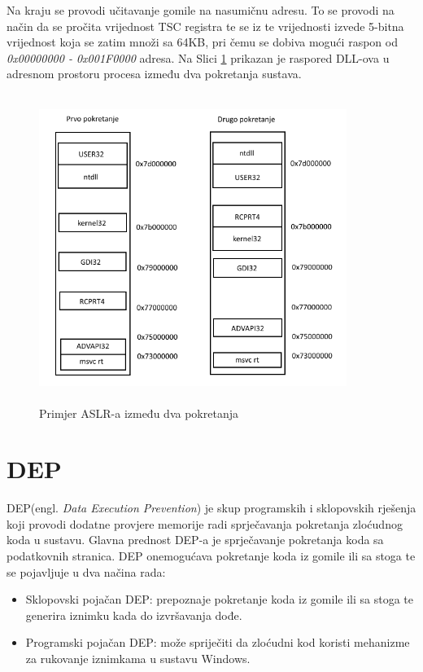 \documentclass[times, utf8, diplomski, numeric]{fer}
\begin{document}
Na kraju se provodi učitavanje gomile na nasumičnu adresu. To se
provodi na način da se pročita vrijednost TSC registra te se iz
te vrijednosti izvede 5-bitna vrijednost koja se zatim množi sa
64KB, pri čemu se dobiva mogući raspon od \emph{0x00000000 -
0x001F0000} adresa. Na Slici \ref{fig:aslr} prikazan je raspored
DLL-ova u adresnom prostoru procesa između dva pokretanja
sustava.

\begin{figure}[!ht]
\centering
\setlength\fboxsep{0pt}
\setlength\fboxrule{0.5pt}
\includegraphics[width=10cm, height=10cm]{slike/aslr_v2}
\caption{Primjer ASLR-a između dva pokretanja}					%
\label{fig:aslr} 
\end{figure} 

\section{DEP}
\label{sct:dep}

DEP(engl. \emph{Data Execution Prevention}) je skup programskih i
sklopovskih rješenja koji provodi dodatne provjere memorije radi
sprječavanja pokretanja zloćudnog koda u sustavu. Glavna prednost
DEP-a je sprječavanje pokretanja koda sa podatkovnih stranica.
DEP onemogućava pokretanje koda iz gomile ili sa stoga te se
pojavljuje u dva načina rada:

\begin{itemize}
\item Sklopovski pojačan DEP: prepoznaje pokretanje koda iz gomile ili sa stoga te generira iznimku kada do izvršavanja dođe.		%
\item Programski pojačan DEP: može spriječiti da zloćudni kod koristi mehanizme za rukovanje iznimkama u sustavu Windows.
\end{itemize}
\end{document}

